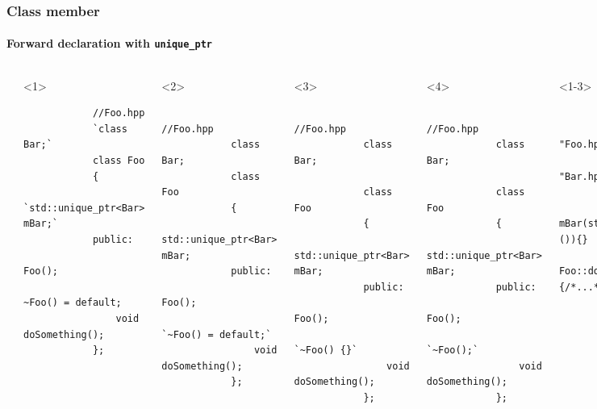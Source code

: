 \documentclass{beamer}
\begin{document}
\begin{frame}[fragile]
\frametitle{Class member}
\framesubtitle{Forward declaration with \texttt{unique\_ptr}}
	
	\begin{columns}[t]
		\begin{lstlisting}
			//Bar.hpp
			class Bar {/*...*/};
		\end{lstlisting}
        \hrulefill
		\begin{onlyenv}<1>
		\begin{lstlisting}
			//Foo.hpp
			`class Bar;`
			class Foo
			{
				`std::unique_ptr<Bar> mBar;`
			public:
				Foo();
				~Foo() = default;
				void doSomething();
			};				
		\end{lstlisting}
		\end{onlyenv}
		
		\begin{onlyenv}<2>
		\begin{lstlisting}
			//Foo.hpp
			class Bar;
			class Foo
			{
				std::unique_ptr<Bar> mBar;
			public:
				Foo();
				`~Foo() = default;`
				void doSomething();
			};				
		\end{lstlisting}
		\end{onlyenv}
		
		\begin{onlyenv}<3>
		\begin{lstlisting}
			//Foo.hpp
			class Bar;
			
			class Foo
			{
				std::unique_ptr<Bar> mBar;
			public:
				Foo();
				`~Foo() {}`
				void doSomething();
			};				
		\end{lstlisting}
		\end{onlyenv}
		
		\begin{onlyenv}<4>
		\begin{lstlisting}
			//Foo.hpp
			class Bar;
			
			class Foo
			{
				std::unique_ptr<Bar> mBar;
			public:
				Foo();
				`~Foo();`
				void doSomething();
			};				
		\end{lstlisting}
		\end{onlyenv}	
        \hrulefill
		\begin{onlyenv}
		\begin{lstlisting}
			//Foo.cpp
			#include "Foo.hpp"
         #include "Bar.hpp"		
			
			Foo::Foo() : mBar(std::make_unique<Bar>()){}
			void Foo::doSomething)(){/*...*/}
		\end{lstlisting}
		\end{onlyenv}
		

\end{columns}
\end{frame}
\end{document}
